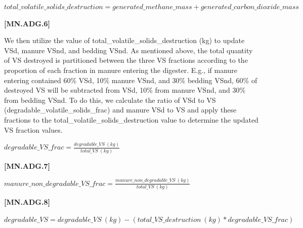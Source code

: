 \begin{refsection}
    \begin{center}
\(total\_volatile\_solids\_destruction = generated\_methane\_mass  + generated\_carbon\_dioxide\_mass \)
    \end{center}
        \vspace{0.5cm} 
    
            {\raggedleft \textbf{[MN.ADG.6]}\par}
            \vspace{0.5cm}
            
    We then utilize the value of total\_volatile\_solids\_destruction (kg) to update VSd, manure VSnd, and bedding VSnd. As mentioned above, the total quantity of VS destroyed is partitioned between the three VS fractions according to the proportion of each fraction in manure entering the digester. E.g., if manure entering contained 60\% VSd, 10\% manure VSnd, and 30\% bedding VSnd, 60\% of destroyed VS will be subtracted from VSd, 10\% from manure VSnd, and 30\% from bedding VSnd.
        \vspace{0.25cm} 
    To do this, we calculate the ratio of VSd to VS (degradable\_volatile\_solids\_frac) and manure VSd to VS and apply these fractions to the total\_volatile\_solids\_destruction value to determine the updated VS fraction values.

            \vspace{0.5cm}

    \begin{center}
\(degradable\_VS\_frac = \frac{degradable\_VS\ (kg)}{total\_VS\ (kg) }\)
    \end{center}
        \vspace{0.5cm} 
    
            {\raggedleft \textbf{[MN.ADG.7]}\par}
            \vspace{0.5cm}

    \begin{center}
\(manure\_non\_degradable\_VS\_frac = \frac{manure\_non\_degradable\_VS\ (kg)}{total\_VS\ (kg) }\)
    \end{center}
        \vspace{0.5cm} 
    
            {\raggedleft \textbf{[MN.ADG.8]}\par}
            \vspace{0.5cm}


    \begin{center}
\(degradable\_VS = degradable\_VS\ (kg)  - (total\_VS\_destruction\ (kg) * degradable\_VS\_frac)\)
    \end{center}
        \vspace{0.5cm} 
    

\end{refsection}
